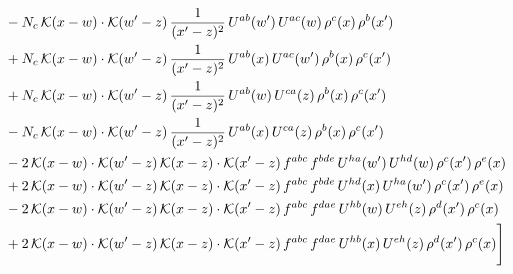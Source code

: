 \documentclass[9pt]{article}
\numberwithin{equation}{section}
\begin{document}
\begin{align}
&-N_{c}\,\mathcal{K}(x-w)\cdot\mathcal{K}(w'-z)\,\frac{1}{(x'-z)^{2}}\,U^{ab}(w')\,U^{ac}(w)\,\rho^{c}(x)\,\rho^{b}(x')\notag \\ & +N_{c}\,\mathcal{K}(x-w)\cdot\mathcal{K}(w'-z)\,\frac{1}{(x'-z)^{2}}\,U^{ab}(x)\,U^{ac}(w')\,\rho^{b}(x)\,\rho^{c}(x')\notag\\
&+N_{c}\,\mathcal{K}(x-w)\cdot\mathcal{K}(w'-z)\,\frac{1}{(x'-z)^{2}}\,U^{ab}(w)\,U^{ca}(z)\,\rho^{b}(x)\,\rho^{c}(x')\notag\\
&-N_{c}\,\mathcal{K}(x-w)\cdot\mathcal{K}(w'-z)\,\frac{1}{(x'-z)^{2}}\,U^{ab}(x)\,U^{ca}(z)\,\rho^{b}(x)\,\rho^{c}(x')\notag\\
&-2\,\mathcal{K}(x-w)\cdot\mathcal{K}(w'-z)\,\mathcal{K}(x-z)\cdot\mathcal{K}(x'-z)\,f^{abc}\,f^{bde}\,U^{ha}(w')\,U^{hd}(w)\,\rho^{c}(x')\,\rho^{e}(x)\notag\\
&+2\,\mathcal{K}(x-w)\cdot\mathcal{K}(w'-z)\,\mathcal{K}(x-z)\cdot\mathcal{K}(x'-z)\,f^{abc}\,f^{bde}\,U^{hd}(x)\,U^{ha}(w')\,\rho^{c}(x')\,\rho^{e}(x)\notag\\
&-2\,\mathcal{K}(x-w)\cdot\mathcal{K}(w'-z)\,\mathcal{K}(x-z)\cdot\mathcal{K}(x'-z)\,f^{abc}\,f^{dae}\,U^{hb}(w)\,U^{eh}(z)\,\rho^{d}(x')\,\rho^{c}(x)\notag\\
&+2\,\mathcal{K}(x-w)\cdot\mathcal{K}(w'-z)\,\mathcal{K}(x-z)\cdot\mathcal{K}(x'-z)\,f^{abc}\,f^{dae}\,U^{hb}(x)\,U^{eh}(z)\,\rho^{d}(x')\,\rho^{c}(x)\Bigg]
\end{align}
\end{document}
